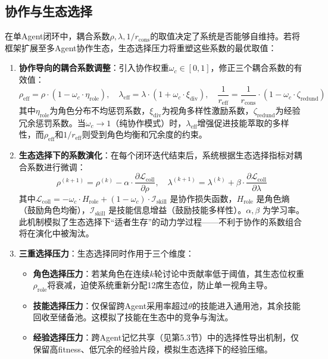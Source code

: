 \documentclass[12pt,a4paper]{ctexart}
\begin{document}
\subsection{协作与生态选择}

在单Agent闭环中，耦合系数$\rho, \lambda, 1/r_{\text{cons}}$的取值决定了系统是否能够自维持。若将框架扩展至多Agent协作生态，生态选择压力将重塑这些系数的最优取值：

\begin{enumerate}
  \item \textbf{协作导向的耦合系数调整}：引入协作权重$\omega_c \in [0,1]$，修正三个耦合系数的有效值：
  \begin{equation}
  \rho_{\text{eff}} = \rho \cdot (1 - \omega_c \cdot \eta_{\text{role}}), \quad
  \lambda_{\text{eff}} = \lambda \cdot (1 + \omega_c \cdot \xi_{\text{div}}), \quad
  \frac{1}{r_{\text{eff}}} = \frac{1}{r_{\text{cons}}} \cdot (1 - \omega_c \cdot \zeta_{\text{redund}})
  \end{equation}
  其中$\eta_{\text{role}}$为角色分布不均惩罚系数，$\xi_{\text{div}}$为视角多样性激励系数，$\zeta_{\text{redund}}$为经验冗余惩罚系数。当$\omega_c \to 1$（纯协作模式）时，$\lambda_{\text{eff}}$增强促进技能萃取的多样性，而$\rho_{\text{eff}}$和$1/r_{\text{eff}}$则受到角色均衡和冗余度的约束。

  \item \textbf{生态选择下的系数演化}：在每个闭环迭代结束后，系统根据生态选择指标对耦合系数进行微调：
  \begin{equation}
  \rho^{(k+1)} = \rho^{(k)} - \alpha \cdot \frac{\partial \mathcal{L}_{\text{coll}}}{\partial \rho}, \quad
  \lambda^{(k+1)} = \lambda^{(k)} + \beta \cdot \frac{\partial \mathcal{L}_{\text{coll}}}{\partial \lambda}
  \end{equation}
  其中$\mathcal{L}_{\text{coll}} = -\omega_c \cdot H_{\text{role}} + (1-\omega_c) \cdot \mathcal{I}_{\text{skill}}$ 是协作损失函数，$H_{\text{role}}$ 是角色熵（鼓励角色均衡），$\mathcal{I}_{\text{skill}}$ 是技能信息增益（鼓励技能多样性）。$\alpha, \beta$ 为学习率。此机制模拟了生态选择下“适者生存”的动力学过程——不利于协作的系数组合将在演化中被淘汰。

  \item \textbf{三重选择压力}：生态选择同时作用于三个维度：
  \begin{itemize}
    \item \textbf{角色选择压力}：若某角色在连续$k$轮讨论中贡献率低于阈值，其生态位权重$\rho_{\text{role}}$将衰减，迫使系统重新分配12席生态位，防止单一视角主导。
    \item \textbf{技能选择压力}：仅保留跨Agent采用率超过$\theta$的技能进入通用池，其余技能回收至储备池。这模拟了技能在生态中的竞争与淘汰。
    \item \textbf{经验选择压力}：跨Agent记忆共享（见第5.3节）中的选择性导出机制，仅保留高fitness、低冗余的经验片段，模拟生态选择下的经验压缩。
  \end{itemize}
\end{enumerate}
\end{document}

